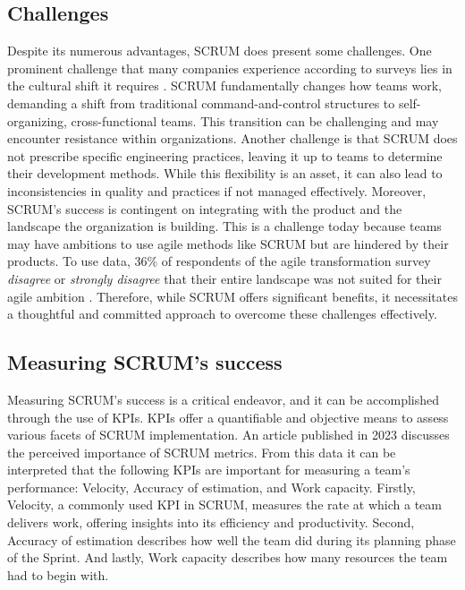 \subsection{Challenges}
Despite its numerous advantages, SCRUM does present some challenges.
One prominent challenge that many companies experience according to surveys 
lies in the cultural shift it requires \parencite{AgileTransformationSurvey}.
SCRUM fundamentally changes how teams work, demanding a shift from 
traditional command-and-control structures to self-organizing, cross-functional teams. 
This transition can be challenging and may encounter resistance within organizations. 
Another challenge is that SCRUM does not prescribe specific engineering practices, 
leaving it up to teams to determine their development methods.
While this flexibility is an asset, it can also lead to inconsistencies 
in quality and practices if not managed effectively.
Moreover, SCRUM's success is contingent on integrating with the product and the landscape 
the organization is building. This is a challenge today because teams may have ambitions to 
use agile methods like SCRUM but are hindered by their products.
To use data, 36\% of respondents of the agile transformation 
survey \textit{disagree} or \textit{strongly disagree} that their entire landscape 
was not suited for their agile ambition \parencite{AgileTransformationSurvey}.
Therefore, while SCRUM offers significant benefits, 
it necessitates a thoughtful and committed approach to overcome these challenges effectively.

\subsection{Measuring SCRUM's success}
Measuring SCRUM's success is a critical endeavor, and it can be accomplished through the use of KPIs.
KPIs offer a quantifiable and objective means to assess various facets of SCRUM implementation. 
An article published in 2023 \parencite{PercPerfOfMetrForAgileScrumEnv} discusses the perceived importance 
of SCRUM metrics. 
From this data it can be interpreted that the following KPIs are 
important for measuring a team's performance: Velocity, 
Accuracy of estimation, and Work capacity. Firstly, Velocity, a commonly used KPI in SCRUM, 
measures the rate at which a team delivers work, offering insights into its efficiency and productivity. 
Second, Accuracy of estimation describes how well the team did during its planning phase of the Sprint. 
And lastly, Work capacity describes how many resources the team had to begin with.

